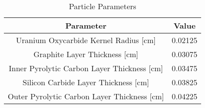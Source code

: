 \begin{table}[h!]
\centering
\begin{tabular}{ c  c }
\hline
Parameter & Value \\
\hline 
Uranium Oxycarbide Kernel Radius [cm] & 0.02125 \\
Graphite Layer Thickness [cm] & 0.03075 \\
Inner Pyrolytic Carbon Layer Thickness [cm] & 0.03475 \\
Silicon Carbide Layer Thickness [cm] & 0.03825 \\
Outer Pyrolytic Carbon Layer Thickness [cm] & 0.04225 \\
\hline
\end{tabular}
\caption{Particle Parameters}
\label{table:params3}
\end{table}